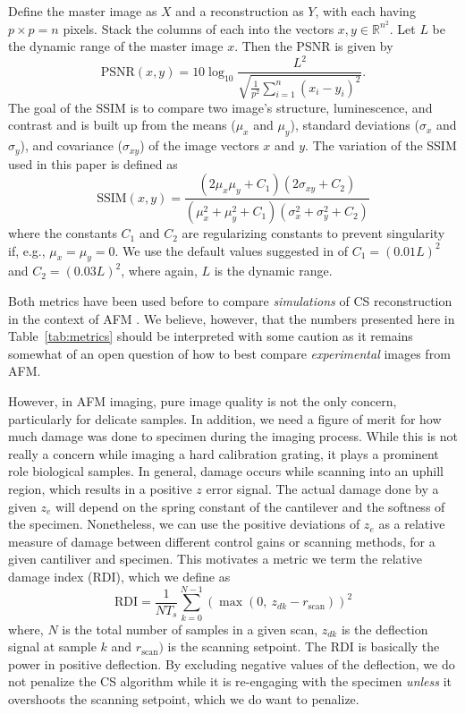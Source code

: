 \documentclass[11pt]{article}
\begin{document}
Define the master image as $X$ and a reconstruction as $Y$, with each having $p\times p=n$ pixels. Stack the columns of each into the vectors $x, y\in\mathbb{R}^{n^2}$. Let $L$ be the dynamic range of the master image $x$. Then the PSNR is given by
\begin{equation*}
  \text{PSNR}(x,y) = 10\log_{10}\frac{L^2}
  {\sqrt{\frac{1}{p^2} \sum_{i=1}^{n}( x_{i} - y_{i})^2}}.
\end{equation*}
The goal of the SSIM is to compare two image's structure, luminescence, and contrast and is built up from the means ($\mu_x$ and $\mu_y$), standard deviations ($\sigma_x$ and $\sigma_y$), and covariance ($\sigma_{xy}$) of the image vectors $x$ and $y$.  
The variation of the SSIM used in this paper is defined as
\begin{equation*}
  \text{SSIM}(x,y) = \frac{(2\mu_x\mu_y + C_1)(2\sigma_{xy}+C_2)}
  {(\mu_x^2 + \mu_y^2 + C_1)(\sigma_x^2 + \sigma_y^2 + C_2)}
\end{equation*}
where the constants $C_1$ and $C_2$ are regularizing constants to prevent singularity if, e.g., $\mu_x=\mu_y=0$. We use the default values suggested in \cite{wang_image_2004} of $C_1=(0.01L)^2$ and ${C_2=(0.03L)^2}$, where again, $L$ is the dynamic range.

Both metrics have been used before to compare \emph{simulations} of CS reconstruction in the context of AFM \cite{oxvig_structure_2017, Luo_nano_2015}. We believe, however, that the numbers presented here in Table~\ref{tab:metrics} should be interpreted with some caution as it remains somewhat of an open question of how to best compare \emph{experimental} images from AFM.



However, in AFM imaging, pure image quality is not the only concern, particularly for delicate samples. In addition, we need a figure of merit for how much damage was done to specimen during the imaging process. While this is not really a concern while imaging a hard calibration grating, it plays a prominent role biological samples. In general, damage occurs while scanning into an uphill region, which results in a positive $z$ error signal. The actual damage done by a given $z_e$ will depend on the spring constant of the cantilever and the softness of the specimen. Nonetheless, we can use the positive deviations of $z_e$ as a relative measure of damage between different control gains or scanning methods, for a given cantiliver and specimen. This motivates a metric we term the relative damage index (RDI), which we define as 
\begin{equation}
  \text{RDI} = \frac{1}{NT_s}\sum_{k=0}^{N-1} \left(\max(0,~z_{dk}-r_{\textrm{scan}})\right)^2 \label{eqn:RDI}
\end{equation}
where, $N$ is the total number of samples in a given scan, $z_{dk}$ is the deflection signal at sample $k$ and $r_{\textrm{scan}})$ is the scanning setpoint. The RDI is basically the power in positive deflection.
By excluding negative values of the deflection, we do not penalize the CS algorithm while it is re-engaging with the specimen \emph{unless} it overshoots the scanning setpoint, which we do want to penalize. 
\end{document}

